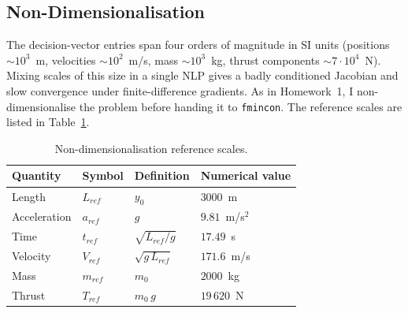 \documentclass[../main.tex]{subfiles}
\begin{document}
\subsection{Non-Dimensionalisation}\label{sec:nondim}

The decision-vector entries span four orders of magnitude in SI units (positions $\sim 10^3$~m, velocities $\sim 10^2$~m/s, mass $\sim 10^3$~kg, thrust components $\sim 7\cdot 10^4$~N). Mixing scales of this size in a single NLP gives a badly conditioned Jacobian and slow convergence under finite-difference gradients. As in Homework~1, I non-dimensionalise the problem before handing it to \texttt{fmincon}. The reference scales are listed in Table~\ref{tab:nondim_scales}.

\begin{table}[H]
\centering
\caption{Non-dimensionalisation reference scales.}
\label{tab:nondim_scales}
\begin{tabular}{llll}
\toprule
Quantity        & Symbol     & Definition                          & Numerical value \\
\midrule
Length          & $L_{ref}$  & $y_0$                               & $3000$~m        \\
Acceleration    & $a_{ref}$  & $g$                                 & $9.81$~m/s$^2$  \\
Time            & $t_{ref}$  & $\sqrt{L_{ref}/g}$                  & $17.49$~s       \\
Velocity        & $V_{ref}$  & $\sqrt{g\,L_{ref}}$                 & $171.6$~m/s     \\
Mass            & $m_{ref}$  & $m_0$                               & $2000$~kg       \\
Thrust          & $T_{ref}$  & $m_0\,g$                            & $19\,620$~N     \\
\bottomrule
\end{tabular}
\end{table}
\end{document}

